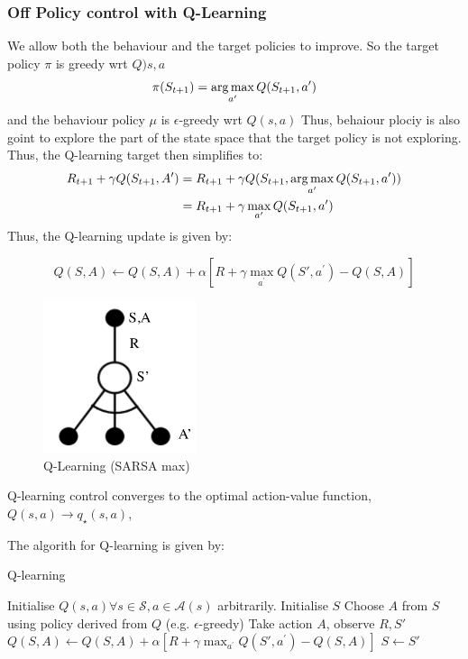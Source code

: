 \subsubsection{Off Policy control with Q-Learning}
We allow both the behaviour and the target policies to improve. So the target policy
\(\pi\) is greedy wrt \(Q)s,a\)
\[
  \pi(S_{t+1}) = \operatorname*{arg\,max}_{a^{\prime}} Q(S_{t+1}, a^{\prime})
\]
and the behaviour policy \(\mu\) is \(\epsilon\)-greedy wrt \(Q(s,a)\)
Thus, behaiour plociy is also goint to explore the part of the state space that the target
policy is not exploring. Thus, the Q-learning target then simplifies to:
\[
  \begin{aligned}
    R_{t+1} + \gamma Q(S_{t+1}, A') &= R_{t+1} + \gamma Q(S_{t+1}, \operatorname*{arg\,max}_{a^{\prime}}
    Q(S_{t+1}, a^{\prime})) \\
    &= R_{t+1} + \gamma \max_{a^{\prime}} Q(S_{t+1}, a^{\prime})  
  \end{aligned}
\]
Thus, the Q-learning update is given by:
\begin{figure}[H]
  \begin{minipage}{0.5\textwidth}
    \[
      Q(S,A) \leftarrow Q(S,A) + \alpha \left[ 
        R + \gamma \max_{a^{\prime}} Q(S', a^{\prime}) - Q(S,A)
      \right]
    \]
  \end{minipage}%
  \begin{minipage}{0.5\textwidth}
    \centering
    \includegraphics[width=0.4\textwidth]{figures/sarsamax.png}
    \caption{Q-Learning (SARSA max)}
    \label{fig:sarsamax}
  \end{minipage}
\end{figure}
\begin{theorem}
  Q-learning control converges to the optimal action-value function, \(Q(s,a) \to q_\star(s,a)\),
\end{theorem}
The algorith for Q-learning is given by:
\begin{algorithm}[H]
  \caption{Q-learning}
  \label{alg:q-learning}
  \begin{algorithmic}[1]
    \State Initialise \(Q(s,a) \forall s \in \mathcal{S}, a \in \mathcal{A}(s)\) arbitrarily.
      \State Initialise \(S\)
        \State Choose \(A\) from \(S\) using policy derived from \(Q\) (e.g.
        \(\epsilon\)-greedy)
        \State Take action \(A\), observe \(R, S'\)
        \State \(Q(S,A) \leftarrow Q(S,A) + \alpha \left[ 
          R + \gamma \max_{a^{\prime}} Q(S', a^{\prime}) - Q(S,A)
        \right] \)
        \State \(S \leftarrow S'\)
      \EndFor
    \EndFor
  \end{algorithmic}
\end{algorithm}

